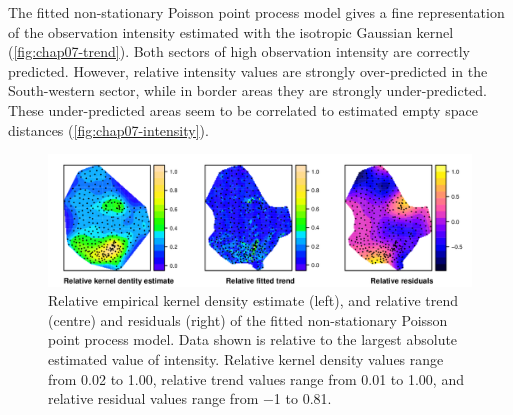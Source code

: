 The fitted non-stationary Poisson point process model gives a fine representation of the observation intensity 
estimated with the isotropic Gaussian kernel (\autoref{fig:chap07-trend}). Both sectors of high observation 
intensity are correctly predicted. However, relative intensity values are strongly over-predicted in the 
South-western sector, while in border areas they are strongly under-predicted. These under-predicted areas 
seem to be correlated to estimated empty space distances (\autoref{fig:chap07-intensity}).

\begin{figure}[!h]
\centering
\includegraphics[width=\textwidth]{fig/chap07-kernel-trend-res}
\caption[Relative empirical kernel density estimate, and relative trend and residuals of the fitted 
non-stationary Poisson point process model.]{Relative empirical kernel density estimate (left), and relative 
trend (centre) and residuals (right) of the fitted non-stationary Poisson point process model. Data shown is 
relative to the largest absolute estimated value of intensity. Relative kernel density values range from 
\num{0.02} to \num{1.00}, relative trend values range from \num{0.01} to \num{1.00}, and relative residual 
values range from \num{-1} to \num{0.81}.}
\label{fig:chap07-trend}
\end{figure}



